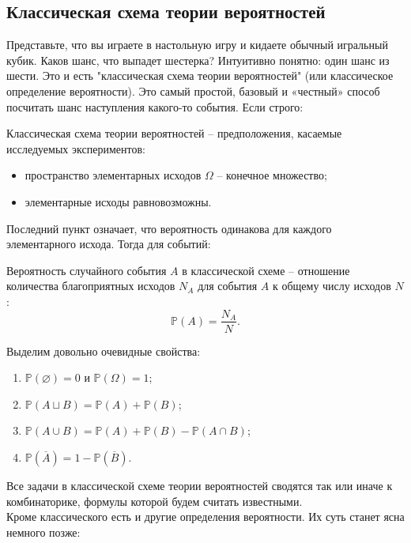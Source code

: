 \subsection{Классическая схема теории вероятностей}
Представьте, что вы играете в настольную игру и кидаете обычный игральный кубик. Каков шанс, что выпадет шестерка? Интуитивно понятно: один шанс из шести.
Это и есть "классическая схема теории вероятностей" (или классическое определение вероятности). Это самый простой, базовый и «честный» способ посчитать шанс наступления какого-то события. Если строго:
\begin{definition}
Классическая схема теории вероятностей -- предположения, касаемые исследуемых экспериментов:
\begin{itemize}
    \item пространство элементарных исходов $\Omega$ -- конечное множество;
    \item элементарные исходы равновозможны.
\end{itemize}
\end{definition}

Последний пункт означает, что вероятность одинакова для каждого элементарного исхода. Тогда для событий:

\begin{definition}
Вероятность случайного события $A$ в классической схеме -- отношение количества благоприятных исходов $N_A$ для события $A$ к общему числу исходов $N$:
\[
\mathbb{P}(A) = \frac{N_A}{N}.
\]
\end{definition}

Выделим довольно очевидные свойства:
\begin{enumerate}
    \item $\mathbb{P}(\varnothing) = 0$ и $\mathbb{P}(\Omega) = 1$;
    \item $\mathbb{P}(A \sqcup B) = \mathbb{P}(A) + \mathbb{P}(B)$;
    \item $\mathbb{P}(A \cup B) = \mathbb{P}(A) + \mathbb{P}(B) - \mathbb{P}(A \cap B)$;
    \item $\mathbb{P}(\overline{A}) = 1 - \mathbb{P}(\overline{B})$.
\end{enumerate}

Все задачи в классической схеме теории вероятностей сводятся так или иначе к комбинаторике, формулы которой будем считать известными.\\
\medskip
Кроме классического есть и другие определения вероятности. Их суть станет ясна немного позже:

